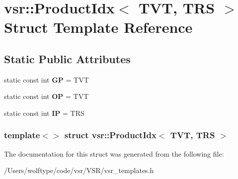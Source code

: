 \hypertarget{structvsr_1_1_product_idx_3_01_t_v_t_00_01_t_r_s_01_4}{\section{vsr\-:\-:Product\-Idx$<$ T\-V\-T, T\-R\-S $>$ Struct Template Reference}
\label{structvsr_1_1_product_idx_3_01_t_v_t_00_01_t_r_s_01_4}
}
\subsection*{Static Public Attributes}
\begin{DoxyCompactItemize}
\item 
\hypertarget{structvsr_1_1_product_idx_3_01_t_v_t_00_01_t_r_s_01_4_abb6b2806780292dba148a580c0c0cb1b}{static const int {\bfseries G\-P} = T\-V\-T}\label{structvsr_1_1_product_idx_3_01_t_v_t_00_01_t_r_s_01_4_abb6b2806780292dba148a580c0c0cb1b}

\item 
\hypertarget{structvsr_1_1_product_idx_3_01_t_v_t_00_01_t_r_s_01_4_a2406d315a9e974422f34a27a09a9cec6}{static const int {\bfseries O\-P} = T\-V\-T}\label{structvsr_1_1_product_idx_3_01_t_v_t_00_01_t_r_s_01_4_a2406d315a9e974422f34a27a09a9cec6}

\item 
\hypertarget{structvsr_1_1_product_idx_3_01_t_v_t_00_01_t_r_s_01_4_aa228112556286ea957c953a32e26c471}{static const int {\bfseries I\-P} = T\-R\-S}\label{structvsr_1_1_product_idx_3_01_t_v_t_00_01_t_r_s_01_4_aa228112556286ea957c953a32e26c471}

\end{DoxyCompactItemize}
\subsubsection*{template$<$$>$ struct vsr\-::\-Product\-Idx$<$ T\-V\-T, T\-R\-S $>$}



The documentation for this struct was generated from the following file\-:\begin{DoxyCompactItemize}
\item 
/\-Users/wolftype/code/vsr/\-V\-S\-R/vsr\-\_\-templates.\-h\end{DoxyCompactItemize}
